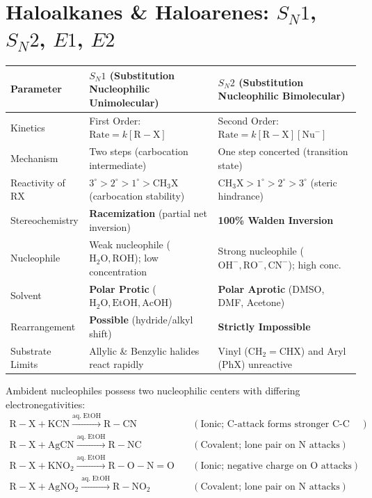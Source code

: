 \documentclass[10pt,a4paper]{article}
\begin{document}
\section{Haloalkanes \& Haloarenes: $S_N1$, $S_N2$, $E1$, $E2$}

\begin{formulabox}
\begin{center}
\scriptsize
\begin{tabular}{|l|p{6.4cm}|p{6.4cm}|}
\hline
\textbf{Parameter} & \textbf{$S_N1$ (Substitution Nucleophilic Unimolecular)} & \textbf{$S_N2$ (Substitution Nucleophilic Bimolecular)} \\
\hline
Kinetics & First Order: $\text{Rate} = k[\mathrm{R-X}]$ & Second Order: $\text{Rate} = k[\mathrm{R-X}][\mathrm{Nu}^-]$ \\
Mechanism & Two steps (carbocation intermediate) & One step concerted (transition state) \\
Reactivity of $\mathrm{RX}$ & $3^\circ > 2^\circ > 1^\circ > \mathrm{CH}_3\mathrm{X}$ (carbocation stability) & $\mathrm{CH}_3\mathrm{X} > 1^\circ > 2^\circ > 3^\circ$ (steric hindrance) \\
Stereochemistry & \textbf{Racemization} (partial net inversion) & \textbf{100\% Walden Inversion} \\
Nucleophile & Weak nucleophile ($\mathrm{H_2O, ROH}$); low concentration & Strong nucleophile ($\mathrm{OH^-, RO^-, CN^-}$); high conc. \\
Solvent & \textbf{Polar Protic} ($\mathrm{H_2O, EtOH, AcOH}$) & \textbf{Polar Aprotic} (DMSO, DMF, Acetone) \\
Rearrangement & \textbf{Possible} (hydride/alkyl shift) & \textbf{Strictly Impossible} \\
Substrate Limits & Allylic \& Benzylic halides react rapidly & Vinyl ($\mathrm{CH_2=CHX}$) and Aryl ($\mathrm{PhX}$) unreactive \\
\hline
\end{tabular}
\end{center}
\end{formulabox}

\begin{formulabox}
Ambident nucleophiles possess two nucleophilic centers with differing electronegativities:
\begin{align*}
  \mathrm{R-X} + \mathrm{KCN} \xrightarrow{\mathrm{aq.\; EtOH}} \mathrm{R-CN} \quad & (\text{Ionic; C-attack forms stronger C-C bond})\\
  \mathrm{R-X} + \mathrm{AgCN} \xrightarrow{\mathrm{aq.\; EtOH}} \mathrm{R-NC} \quad & (\text{Covalent; lone pair on N attacks})\\
  \mathrm{R-X} + \mathrm{KNO_2} \xrightarrow{\mathrm{aq.\; EtOH}} \mathrm{R-O-N=O} \quad & (\text{Ionic; negative charge on O attacks})\\
  \mathrm{R-X} + \mathrm{AgNO_2} \xrightarrow{\mathrm{aq.\; EtOH}} \mathrm{R-NO_2} \quad & (\text{Covalent; lone pair on N attacks})
\end{align*}
\end{formulabox}
\end{document}
